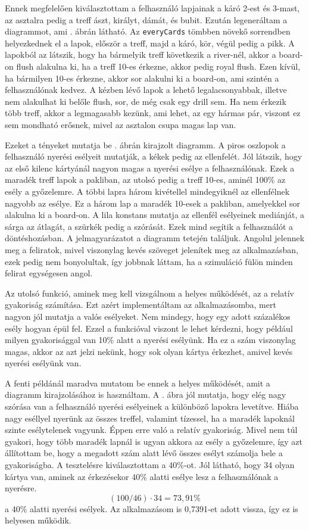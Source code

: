Ennek megfelelően kiválasztottam a felhasználó lapjainak a káró 2-est és 3-mast, az asztalra pedig a treff ászt, királyt, dámát, és bubit. Ezután legeneráltam a diagrammot, ami . ábrán látható. Az \texttt{everyCards} tömbben növekő sorrendben helyezkednek el a lapok, először a treff, majd a káró, kör, végül pedig a pikk. A lapokból az látszik, hogy ha bármelyik treff következik a river-nél, akkor a board-on flush alakulna ki, ha a treff 10-es érkezne, akkor pedig royal flush. Ezen kívül, ha bármilyen 10-es érkezne, akkor sor alakulni ki a board-on, ami szintén a felhasználónak kedvez. A kézben lévő lapok a lehető legalacsonyabbak, illetve nem alakulhat ki belőle flush, sor, de még csak egy drill sem. Ha nem érkezik több treff, akkor a legmagasabb kezünk, ami lehet, az egy hármas pár, viszont ez sem mondható erősnek, mivel az asztalon csupa magas lap van. 

Ezeket a tényeket mutatja be . ábrán kirajzolt diagramm. A piros oszlopok a felhasználó nyerési esélyeit mutatják, a kékek pedig az ellenfelét. Jól látszik, hogy az első kilenc kártyánál nagyon magas a nyerési esélye a felhasználónak. Ezek a maradék treff lapok a pakliban, az utolsó pedig a treff 10-es, aminél 100\% az esély a győzelemre. A többi lapra három kivétellel mindegyiknél az ellenfélnek nagyobb az esélye. Ez a három lap a maradék 10-esek a pakliban, amelyekkel sor alakulna ki a board-on. A lila konstans mutatja az ellenfél esélyeinek mediánját, a sárga az átlagát, a szürkék pedig a szórását. Ezek mind segítik a felhasználót a döntéshozásban. A jelmagyarázatot a diagramm tetején találjuk. Angolul jelennek meg a feliratok, mivel viszonylag kevés szöveget jelenítek meg az alkalmazásban, ezek pedig nem bonyolultak, így jobbnak láttam, ha a szimuláció fülön minden felirat egységesen angol.

Az utolsó funkció, aminek meg kell vizsgálnom a helyes működését, az a relatív gyakoriság számítása. Ezt azért implementáltam az alkalmazásomba, mert nagyon jól mutatja a valós esélyeket. Nem mindegy, hogy egy adott százalékos esély hogyan épül fel. Ezzel a funkcióval viszont le lehet kérdezni, hogy például milyen gyakorisággal van 10\% alatt a nyerési esélyünk. Ha ez a szám viszonylag magas, akkor az azt jelzi nekünk, hogy sok olyan kártya érkezhet, amivel kevés nyerési esélyünk van.

A fenti példánál maradva mutatom be ennek a helyes működését, amit a diagramm kirajzolásához is használtam. A . ábra jól mutatja, hogy elég nagy szórása van a felhasználó nyerési esélyeinek a különböző lapokra levetítve. Hiába nagy eséllyel nyerünk az összes treffel, valamint tízessel, ha a maradék lapoknál szinte esélytelenek vagyunk. Éppen erre való a relatív gyakoriság. Mivel nem túl gyakori, hogy több maradék lapnál is ugyan akkora az esély a győzelemre, így azt állítottam be, hogy a megadott szám alatt lévő összes esélyt számolja bele a gyakoriságba. A tesztelésre kiválasztottam a 40\%-ot. Jól látható, hogy 34 olyan kártya van, aminek az érkezésekor 40\% alatti esélye lesz a felhasználónak a nyerésre. \[(100/46)\cdot 34 = 73,91\%\] a 40\% alatti nyerési esélyek. Az alkalmazásom is 0,7391-et adott vissza, így ez is helyesen működik.

